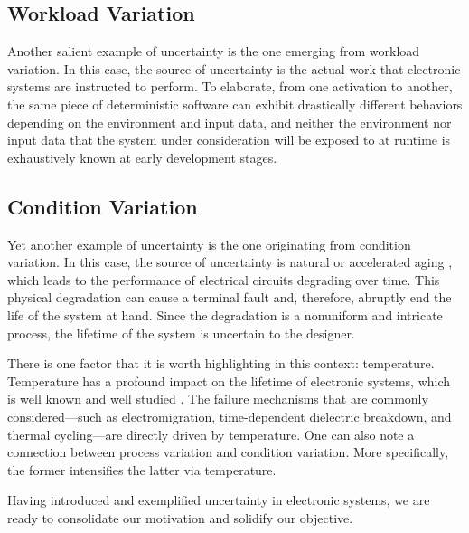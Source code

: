 \subsection{Workload Variation}

Another salient example of uncertainty is the one emerging from workload
variation. In this case, the source of uncertainty is the actual work that
electronic systems are instructed to perform. To elaborate, from one activation
to another, the same piece of deterministic software can exhibit drastically
different behaviors depending on the environment and input data, and neither the
environment nor input data that the system under consideration will be exposed
to at runtime is exhaustively known at early development stages.

\subsection{Condition Variation}

Yet another example of uncertainty is the one originating from condition
variation. In this case, the source of uncertainty is natural or accelerated
aging \cite{jedec2016}, which leads to the performance of electrical circuits
degrading over time. This physical degradation can cause a terminal fault and,
therefore, abruptly end the life of the system at hand. Since the degradation is
a nonuniform and intricate process, the lifetime of the system is uncertain to
the designer.

There is one factor that it is worth highlighting in this context: temperature.
Temperature has a profound impact on the lifetime of electronic systems, which
is well known and well studied \cite{jedec2016}. The failure mechanisms that are
commonly considered---such as electromigration, time-dependent dielectric
breakdown, and thermal cycling---are directly driven by temperature. One can
also note a connection between process variation and condition variation. More
specifically, the former intensifies the latter via temperature.

\conclusioncut
Having introduced and exemplified uncertainty in electronic systems, we are
ready to consolidate our motivation and solidify our objective.
